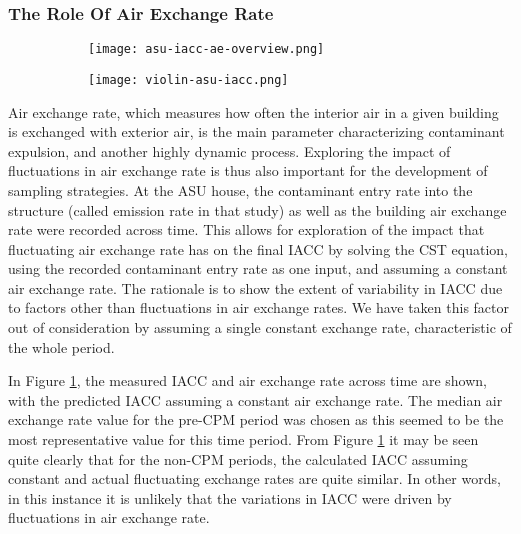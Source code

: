\documentclass[journal=esthag,manuscript=article]{achemso}
\begin{document}
\subsubsection{The Role Of Air Exchange Rate}
\begin{figure}[htb!]
  \caption{Comparison between the recorded  and the calculated TCE in indoor air at the ASU house, assuming constant air exchange rate. \ref{fig:asu-iacc-ae-overview} shows the TCE in indoor air across time as well as the exchange rate. \ref{fig:violin-iacc-aet} shows the distribution of these values for three periods.}
  \label{fig:ae-analysis}
  \begin{subfigure}{\textwidth}
    \caption{ }
    \label{fig:asu-iacc-ae-overview}
    \texttt{[image: asu-iacc-ae-overview.png]}
  \end{subfigure}
  \begin{subfigure}{0.75\textwidth}
    \caption{ }
    \label{fig:violin-iacc-aet}
    \texttt{[image: violin-asu-iacc.png]}
  \end{subfigure}
\end{figure}
Air exchange rate, which measures how often the interior air in a given building is exchanged with exterior air, is the main parameter characterizing contaminant expulsion, and another highly dynamic process.
Exploring the impact of fluctuations in air exchange rate is thus also important for the development of sampling strategies.
At the ASU house, the contaminant entry rate into the structure (called emission rate in that study) as well as the building air exchange rate were recorded across time.
This allows for exploration of the impact that fluctuating air exchange rate has on the final IACC by solving the CST equation, using the recorded contaminant entry rate as one input, and assuming a constant air exchange rate.
The rationale is to show the extent of variability in IACC due to factors other than fluctuations in air exchange rates.
We have taken this factor out of consideration by assuming a single constant exchange rate, characteristic of the whole period.

In Figure \ref{fig:asu-iacc-ae-overview}, the measured IACC and air exchange rate across time are shown, with the predicted IACC assuming a constant air exchange rate.
The median air exchange rate value for the pre-CPM period was chosen as this seemed to be the most representative value for this time period.
From Figure \ref{fig:asu-iacc-ae-overview} it may be seen quite clearly that for the non-CPM periods, the calculated IACC assuming constant and actual fluctuating exchange rates are quite similar.
In other words, in this instance it is unlikely that the variations in IACC were driven by fluctuations in air exchange rate.
\end{document}
